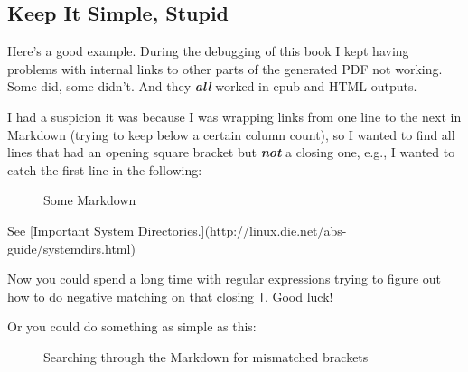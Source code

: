\documentclass[10pt,american,]{book}
\newenvironment{Shaded}{\begin{snugshade}}{\end{snugshade}}
\newcommand{\KeywordTok}[1]{\textcolor[rgb]{0.13,0.29,0.53}{\textbf{{#1}}}}
\newcommand{\StringTok}[1]{\textcolor[rgb]{0.31,0.60,0.02}{{#1}}}
\newcommand{\OtherTok}[1]{\textcolor[rgb]{0.56,0.35,0.01}{{#1}}}
\newcommand{\NormalTok}[1]{{#1}}
\numberwithin{figure}{chapter}
\DeclareRobustCommand{\drcap}[1]{\begin{figure}[H]\caption{#1}\end{figure}}
\renewcommand{\KeywordTok}[1]{{#1}}
\renewcommand{\StringTok}[1]{{#1}}
\renewcommand{\OtherTok}[1]{{#1}}
\renewcommand{\NormalTok}[1]{{#1}}
\begin{document}
\subsection*{Keep It Simple, Stupid}\label{keep-it-simple-stupid}

Here's a good example. During the debugging of this book I kept having
problems with internal links to other parts of the generated PDF not
working. Some did, some didn't. And they \textbf{\emph{all}} worked in
epub and HTML outputs.

I had a suspicion it was because I was wrapping links from one line to
the next in Markdown (trying to keep below a certain column count), so I
wanted to find all lines that had an opening square bracket but
\textbf{\emph{not}} a closing one, e.g., I wanted to catch the first
line in the following:

\drcap{Some Markdown}

\begin{Shaded}
\begin{Highlighting}[]
\KeywordTok{See} \NormalTok{[Important System}
\KeywordTok{Directories.}\NormalTok{](http://linux.die.net/abs-guide/systemdirs.html)}
\end{Highlighting}
\end{Shaded}

Now you could spend a long time with regular expressions trying to
figure out how to do negative matching on that closing \texttt{{]}}.
Good luck!

Or you could do something as simple as this:

\drcap{Searching through the Markdown for mismatched brackets}

\begin{Shaded}
\begin{Highlighting}[]
\NormalTok{$ }\KeywordTok{grep} \StringTok{'\textbackslash{}['} \NormalTok{*.md }\KeywordTok{|} \KeywordTok{grep} \NormalTok{-v }\StringTok{']'}
\KeywordTok{Step01.md}\NormalTok{: (( expression ))           }\KeywordTok{if} \KeywordTok{COMMANDS;} \KeywordTok{then} \KeywordTok{COMMANDS; [} \NormalTok{elif C>}
\NormalTok{Step01.md: :                          kill [}\OtherTok{-s} \NormalTok{sigspec | }\OtherTok{-n} \NormalTok{signum | -sigs>}
\NormalTok{Step04.md:./FileCheckers/otschecker:  [ }\OtherTok{$rc} \OtherTok{!=} \NormalTok{0 }\OtherTok{-a} \StringTok{"}\OtherTok{$pdfinfo}\StringTok{"} \OtherTok{!=} \StringTok{"Comma...}
\StringTok{Step04.md:./FileCheckers/pdfpwdchecker: if [ }\OtherTok{$rc}\StringTok{ != 0 -a "}\OtherTok{$pdfinfo}\StringTok{" = "}\NormalTok{C...}
\end{Highlighting}
\end{Shaded}
\end{document}
